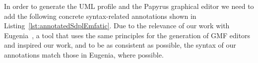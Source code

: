 In order to generate the UML profile and the Papyrus graphical editor we need to add the following concrete syntax-related annotations shown in Listing~\ref{lst:annotatedSdplEmfatic}. Due to the relevance of our work with Eugenia~\cite{kolovos2015eugenia}, a tool that uses the same principles for the generation of GMF editors and inspired our work, and to be as consistent as possible, the syntax of our annotations match those in Eugenia, where possible.

\begin{figure}
	
\end{figure}

